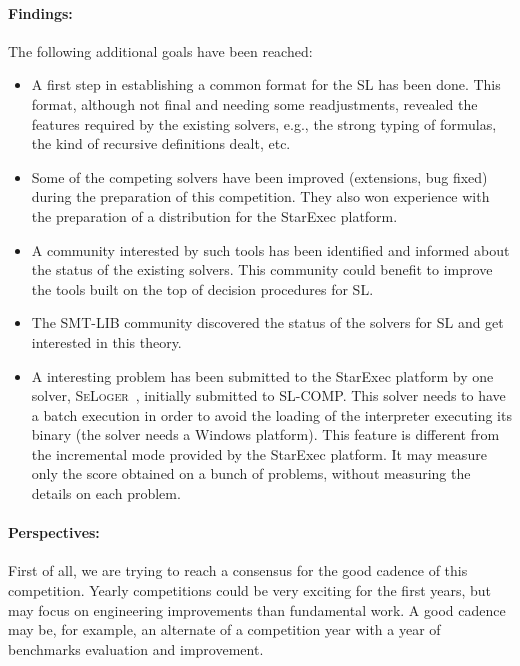 \documentclass{llncs}
\begin{document}
\paragraph{Findings:}
The following additional goals have been reached:
\begin{itemize}
\item A first step in establishing a common format for the SL has been done. 
This format, although not final and needing some readjustments, revealed the features required by the existing solvers, e.g., the strong typing of formulas, the kind of recursive definitions dealt, etc.

\item Some of the competing solvers have been improved (extensions, bug fixed) during the preparation of this competition. They also won experience with the preparation of a distribution for the StarExec platform.

\item A community interested by such tools has been identified and informed about the status of the existing solvers. This community could benefit to improve the tools built on the top of decision procedures for SL.

\item The SMT-LIB community discovered the status of the solvers for SL and get interested in this theory.

\item A interesting problem has been submitted to the StarExec platform by one solver, \textsc{SeLoger}~\cite{HasseIOP13}, initially submitted to SL-COMP. This solver needs to have a batch execution in order to avoid the loading of the interpreter executing its binary (the solver needs a Windows platform).
This feature is different from the incremental mode provided by the StarExec platform. It may measure only the score obtained on a bunch of problems, without measuring the details on each problem. 
 
\end{itemize}


\paragraph{Perspectives:}
First of all, we are trying to reach a consensus for the good cadence of this competition. Yearly competitions could be very exciting for the first years, but may focus on engineering improvements than fundamental work. 
A good cadence may be, for example, an alternate of a competition year with a year of benchmarks evaluation and improvement.
\end{document}
